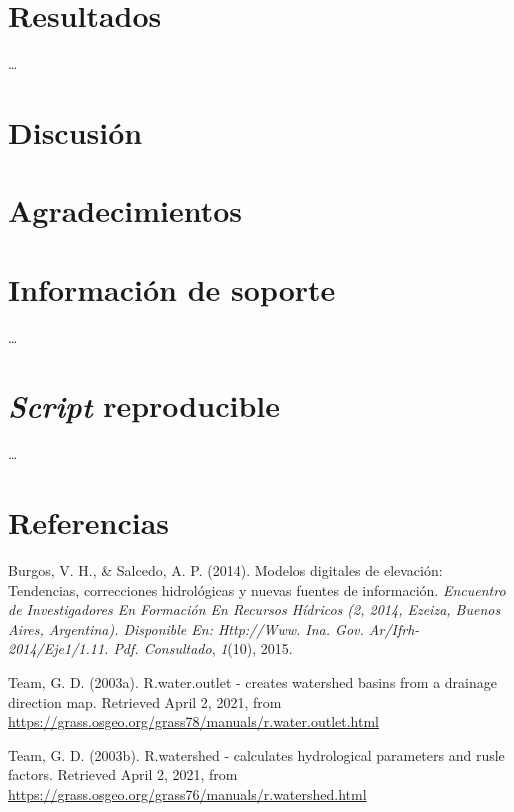 \documentclass[11pt,]{article}
\begin{document}
\section{Resultados}\label{resultados}

\ldots

\section{Discusión}\label{discusiuxf3n}

\section{Agradecimientos}\label{agradecimientos}

\section{Información de soporte}\label{informaciuxf3n-de-soporte}

\ldots

\section{\texorpdfstring{\emph{Script}
reproducible}{Script reproducible}}\label{script-reproducible}

\ldots

\section*{Referencias}\label{referencias}

\hypertarget{refs}{}
\hypertarget{ref-burgos2014modelos}{}
Burgos, V. H., \& Salcedo, A. P. (2014). Modelos digitales de elevación:
Tendencias, correcciones hidrológicas y nuevas fuentes de información.
\emph{Encuentro de Investigadores En Formación En Recursos Hídricos (2,
2014, Ezeiza, Buenos Aires, Argentina). Disponible En: Http://Www. Ina.
Gov. Ar/Ifrh-2014/Eje1/1.11. Pdf. Consultado}, \emph{1}(10), 2015.

\hypertarget{ref-addonrwateroutlet}{}
Team, G. D. (2003a). R.water.outlet - creates watershed basins from a
drainage direction map. Retrieved April 2, 2021, from
\url{https://grass.osgeo.org/grass78/manuals/r.water.outlet.html}

\hypertarget{ref-addonrwater}{}
Team, G. D. (2003b). R.watershed - calculates hydrological parameters
and rusle factors. Retrieved April 2, 2021, from
\url{https://grass.osgeo.org/grass76/manuals/r.watershed.html}




\newpage
\singlespacing 
\end{document}
